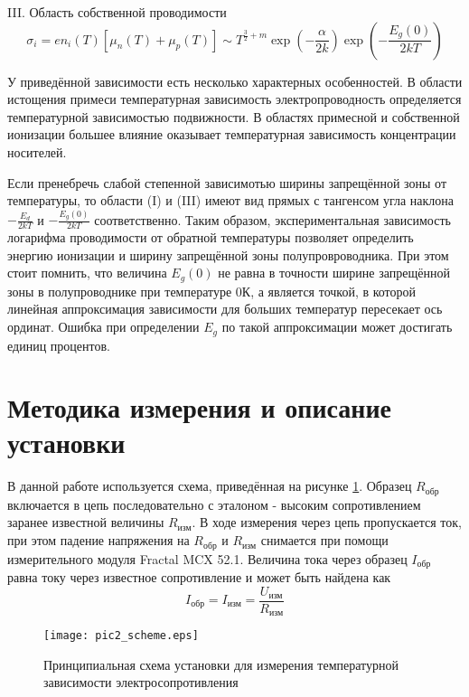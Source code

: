 III. Область собственной проводимости
\begin{equation}
\sigma_{i} = e n_{i}(T) \left[ \mu_{n}(T) + \mu_{p}(T) \right] \sim T^{\frac{3}{2} + m} \exp{\left( -\frac{\alpha}{2 k} \right)} \exp{\left( -\frac{E_{g}(0)}{2 k T} \right)}
\end{equation}

У приведённой зависимости есть несколько характерных особенностей. В области истощения примеси температурная зависимость электропроводность определяется температурной зависимостью подвижности. В областях примесной и собственной ионизации большее влияние оказывает температурная зависимость концентрации носителей.

Если пренебречь слабой степенной зависимотью ширины запрещённой зоны от температуры, то области (I) и (III) имеют вид прямых с тангенсом угла наклона $-\frac{E_{d}}{2 k T}$ и $-\frac{E_{g}(0)}{2 k T}$ соответственно. Таким образом, экспериментальная зависимость логарифма проводимости от обратной температуры позволяет определить энергию ионизации и ширину запрещённой зоны полупровроводника. При этом стоит помнить, что величина $E_{g}(0)$ не равна в точности ширине запрещённой зоны в полупроводнике при температуре 0\textdegree К, а является точкой, в которой линейная аппроксимация зависимости для больших температур пересекает ось ординат. Ошибка при определении $E_{g}$ по такой аппроксимации может достигать единиц процентов.

\section{Методика измерения и описание установки}

В данной работе используется схема, приведённая на рисунке \ref{pic2_scheme}. Образец $R_{\text{обр}}$ включается в цепь последовательно с эталоном - высоким сопротивлением заранее известной величины $R_{\text{изм}}$. В ходе измерения через цепь пропускается ток, при этом падение напряжения на $R_{\text{обр}}$ и $R_{\text{изм}}$ снимается при помощи измерительного модуля Fractal MCX 52.1. Величина тока через образец $I_{\text{обр}}$ равна току через известное сопротивление и может быть найдена как
\begin{equation}
I_{\text{обр}} = I_{\text{изм}} = \frac{U_{\text{изм}}}{R_{\text{изм}}}
\end{equation}

\begin{figure}[h!]\centering
\texttt{[image: pic2\_scheme.eps]}
\caption{Принципиальная схема установки для измерения температурной зависимости электросопротивления}
\label{pic2_scheme}
\end{figure}

